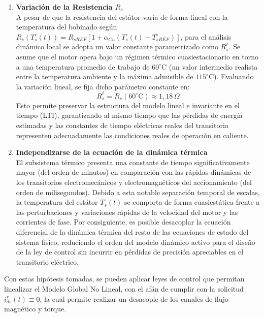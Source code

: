 \documentclass[blue,fullpaper]{ludusofficial}  %
\begin{document}
\begin{enumerate}
    \item \textbf{Variación de la Resistencia \(R_s\)} \\
A pesar de que la resistencia del estátor varía de forma lineal con la temperatura del bobinado según $R_s(T_s^\circ(t)) = R_{sREF}[1 + \alpha_{Cu}(T_s^\circ(t) - T_{sREF}^\circ)]$, para el análisis dinámico local se adopta un valor constante parametrizado como $R_s^\ell$. Se asume que el motor opera bajo un régimen térmico cuasiestacionario en torno a una temperatura promedio de trabajo de $60^\circ\text{C}$ (un valor intermedio realista entre la temperatura ambiente y la máxima admisible de $115^\circ\text{C}$). Evaluando la variación lineal, se fija dicho parámetro constante en:
    \begin{equation}
\label{eq:resistencia-local}
        R_s^\ell = R_s(60^\circ\text{C}) \approx 1{,}18\,\Omega
    \end{equation}
Esto permite preservar la estructura del modelo lineal e invariante en el tiempo (LTI), garantizando al mismo tiempo que las pérdidas de energía estimadas y las constantes de tiempo eléctricas reales del transitorio representen adecuadamente las condiciones reales de operación en caliente.
    
    \item \textbf{Independizarse de la ecuación de la dinámica térmica} \\
El subsistema térmico presenta una constante de tiempo significativamente mayor (del orden de minutos) en comparación con las rápidas dinámicas de los transitorios electromecánicos y electromagnéticos del accionamiento (del orden de milisegundos). Debido a esta notable separación temporal de escalas, la temperatura del estátor $T_s^\circ(t)$ se comporta de forma cuasiestática frente a las perturbaciones y variaciones rápidas de la velocidad del motor y las corrientes de fase. Por consiguiente, es posible desacoplar la ecuación diferencial de la dinámica térmica del resto de las ecuaciones de estado del sistema físico, reduciendo el orden del modelo dinámico activo para el diseño de la ley de control sin incurrir en pérdidas de precisión apreciables en el transitorio eléctrico.
    
\end{enumerate}

Con estas hipótesis tomadas, se pueden aplicar leyes de control que permitan linealizar el Modelo Global No Lineal, con el afán de cumplir con la solicitud $i_{ds}^{r}(t) \equiv 0$, la cual permite realizar un desacople de los canales de flujo magnético y torque.
\end{document}
